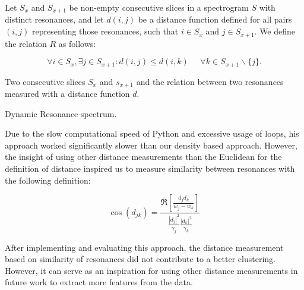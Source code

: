 \begin{definition}
Let $S_x$ and $S_{x+1}$ be non-empty consecutive slices in a spectrogram $S$ with distinct resonances, and let $d(i, j)$ be a distance function defined for all pairs $(i, j)$ representing those resonances, such that $i \in S_x$ and $j \in S_{x+1}$. We define the relation $R$ as follows: 

\begin{equation}
    \forall i \in S_x, \exists j \in S_{x+1}: d(i,j) \leq d(i,k) \; \; \;  \; \; \forall k \in S_{x+1} \smallsetminus \{j\}.
\end{equation}

\end{definition}

\begin{marginfigure}
\centering

\vspace{0.1cm}
\caption{Two consecutive slices $S_x$ and $s_{x+1}$ and the relation between two resonances measured with a distance function $d$.}
\label{distanceMeasurement} 
\end{marginfigure}

 \begin{marginfigure}
    \centering
    \vspace{2cm}
    
    \caption{Dynamic Resonance spectrum.}
    \label{fig:DynamicResonance}
\end{marginfigure}

Due to the slow computational speed of Python and excessive usage of loops, his approach worked significantly slower than our density based approach. However, the insight of using other distance measurements than the Euclidean for the definition of distance inspired us to measure similarity between resonances with the following definition:
 

\begin{equation}
    \cos (d_{jk}) = \frac{\Re \left[\frac{d_jd_k}{w_j-w_k}\right]}{\frac{|d_j|^2}{\gamma_j}\frac{|d_k|^2}{\gamma_k}}
\end{equation}

After implementing and evaluating this approach, the distance measurement based on similarity of resonances did not contribute to a better clustering. However, it can serve as an inspiration for using other distance measurements in future work to extract more features from the data.


